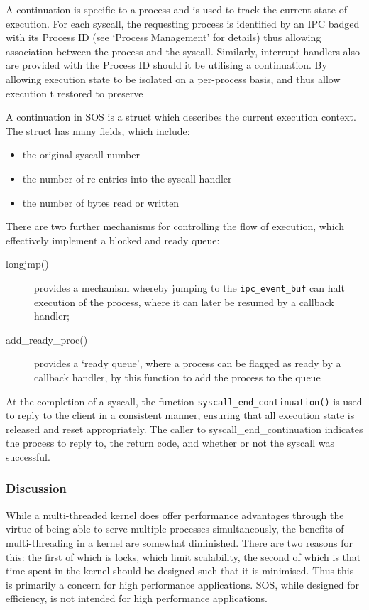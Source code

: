 \documentclass[a4paper,12pt]{article}
\begin{document}
A continuation is specific to a process and is used to track the current state
of execution.  For each syscall, the requesting process is identified by an
IPC badged with its Process ID (see `Process Management' for details) thus
allowing association between the process and the syscall.  Similarly,
interrupt handlers also are provided with the Process ID should it be
utilising a continuation.  By allowing execution state to be isolated on a
per-process basis, and thus allow execution t restored to preserve

A continuation in SOS is a struct which describes the current execution
context.  The struct has many fields, which include:

\begin{itemize}
\item the original syscall number
\item the number of re-entries into the syscall handler
\item the number of bytes read or written
\end{itemize}

There are two further mechanisms for controlling the flow of execution, which
effectively implement a blocked and ready queue:
\begin{description}
\item[longjmp()] provides a mechanism whereby jumping to the \texttt{ipc\_event\_buf}
  can halt execution of the process, where it can later be resumed by a
  callback handler;
\item[add\_ready\_proc()] provides a `ready queue', where a process can be
  flagged as ready by a callback handler, by this function to add the process
  to the queue
\end{description}

At the completion of a syscall, the function
\texttt{syscall\_end\_continuation()} is used to reply to the client in a
consistent manner, ensuring that all execution state is released and reset
appropriately.  The caller to syscall\_end\_continuation indicates the process
to reply to, the return code, and whether or not the syscall was successful.

\subsubsection{Discussion}
While a multi-threaded kernel does offer performance advantages through the
virtue of being able to serve multiple processes simultaneously, the benefits
of multi-threading in a kernel are somewhat diminished.  There are two reasons
for this: the first of which is locks, which limit scalability, the second of
which is that time spent in the kernel should be designed such that it is
minimised.  Thus this is primarily a concern for high performance
applications.  SOS, while designed for efficiency, is not intended for high
performance applications.
\end{document}
